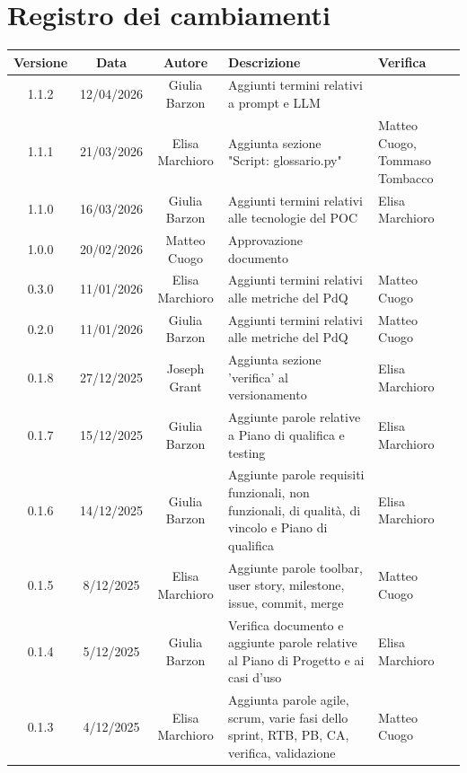 \documentclass[11pt,a4paper]{article}
\begin{document}
\section*{Registro dei cambiamenti}

\begin{table}[H]
    \centering
    \begin{tabular}{|c|c|c|>{\raggedright\arraybackslash}p{}|p{}|}
        \hline
        \textbf{Versione} & \textbf{Data} & \textbf{Autore} & \textbf{Descrizione} & \textbf{Verifica} \\
        \hline
        1.1.2 & 12/04/2026 & Giulia Barzon & Aggiunti termini relativi a prompt e LLM & \\
        \hline
        1.1.1 & 21/03/2026 & Elisa Marchioro & Aggiunta sezione "Script: glossario.py" & Matteo Cuogo, Tommaso Tombacco\\
        \hline
        1.1.0 & 16/03/2026 & Giulia Barzon & Aggiunti termini relativi alle tecnologie del POC & Elisa Marchioro\\
        \hline
        1.0.0 & 20/02/2026 & Matteo Cuogo & Approvazione documento & \\
        \hline
        0.3.0 & 11/01/2026 & Elisa Marchioro & Aggiunti termini relativi alle metriche del PdQ & Matteo Cuogo \\
        \hline
        0.2.0 & 11/01/2026 & Giulia Barzon & Aggiunti termini relativi alle metriche del PdQ &  Matteo Cuogo\\
        \hline
        0.1.8 & 27/12/2025 & Joseph Grant & Aggiunta sezione 'verifica' al versionamento & Elisa Marchioro\\
        \hline
        0.1.7 & 15/12/2025 & Giulia Barzon & Aggiunte parole relative a Piano di qualifica e testing & Elisa Marchioro\\
        \hline
        0.1.6 & 14/12/2025 & Giulia Barzon & Aggiunte parole requisiti funzionali, non funzionali, di qualità, di vincolo e Piano di qualifica & Elisa Marchioro\\
        \hline
        0.1.5 & 8/12/2025 & Elisa Marchioro & Aggiunte parole toolbar, user story, milestone, issue, commit, merge & Matteo Cuogo\\
        \hline
        0.1.4 & 5/12/2025 & Giulia Barzon & Verifica documento e aggiunte parole relative al Piano di Progetto e ai casi d'uso & Elisa Marchioro\\
        \hline
        0.1.3 & 4/12/2025 & Elisa Marchioro & Aggiunta parole agile, scrum, varie fasi dello sprint, RTB, PB, CA, verifica, validazione & Matteo Cuogo\\

\end{tabular}
\end{table}
\end{document}
